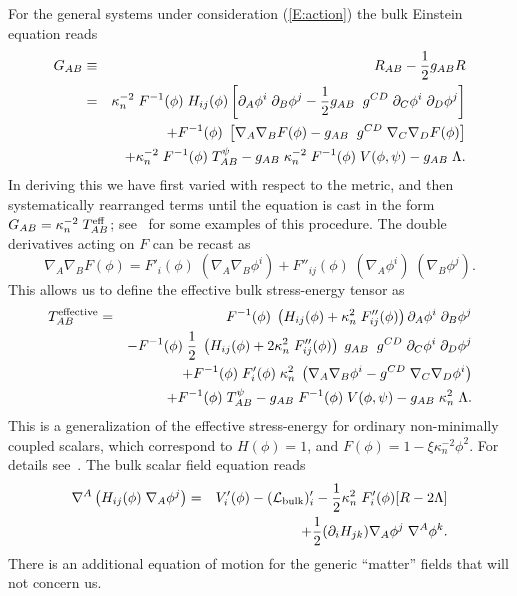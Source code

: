 \documentclass[a4paper,10pt]{article}
\begin{document}
For the general systems under consideration (\ref{E:action}) the
bulk Einstein equation reads
%
\begin{eqnarray}
G_{AB}&\equiv& R_{AB}-{1 \over 2}g_{AB}R
\nonumber\\
&=& 
\kappa_n^{-2} \; F^{-1}(\phi) \; H_{ij}(\phi)
\left[
\partial_{A}\phi^i \; \partial_{B}\phi^j 
-{1 \over 2} g_{AB} \;\;
g^{CD} \;\partial_{C}\phi^i \; \partial_{D}\phi^j
\right] 
\nonumber \\
&&
+F^{-1}(\phi) \; 
\left[
\nabla_A \nabla_B F(\phi)
-g_{AB}  \; \; g^{CD} \;\nabla_C \nabla_D F(\phi)
\right]
\nonumber \\
&&
+\kappa_n^{-2}\;F^{-1}(\phi) \; T_{AB}^\psi
- g_{AB} \;\kappa_n^{-2}\;F^{-1}(\phi)\; V(\phi,\psi)
- g_{AB} \;\Lambda.
\label{E:bulk-einstein-tensor}
\end{eqnarray}
%
In deriving this we have first varied with respect to the metric, and
then systematically rearranged terms until the equation is cast in the
form $G_{AB} = \kappa_n^{-2}\;T^{\mathrm{eff}}_{AB}$; see~\cite{scalars} for
some examples of this procedure.  The double derivatives acting on $F$
can be recast as
%
\begin{equation}
\nabla_A \nabla_B F(\phi) = 
F'_i(\phi) \; (\nabla_A \nabla_B \phi^i)  
+
F''_{ij}(\phi) \; (\nabla_A \phi^i) \; (\nabla_B \phi^j).
\end{equation}
%
This allows us to define the effective bulk stress-energy tensor as
%
\begin{eqnarray}
T_{AB}^{\mathrm{effective}} &=& 
F^{-1}(\phi) \; 
\left(H_{ij}(\phi) + \kappa_n^2 \; F''_{ij}(\phi) \right)
\partial_{A}\phi^i \; \partial_{B}\phi^j 
\nonumber \\
&& - 
F^{-1}(\phi)  \;  {1 \over 2} \;
\left(H_{ij}(\phi) + 2 \kappa_n^2 \; F''_{ij}(\phi) \right)
\; g_{AB} \;\;
g^{CD} \;\partial_{C}\phi^i \; \partial_{D}\phi^j 
\nonumber \\
&&
+F^{-1}(\phi) \;  F'_i(\phi) \; \kappa_n^2 \;
\left(
\nabla_A \nabla_B \phi^i - g^{CD} \;\nabla_C \nabla_D\phi^i
\right)
\nonumber \\
&&
+F^{-1}(\phi) \; T_{AB}^\psi
- g_{AB} \;F^{-1}(\phi)\; V(\phi,\psi)
- g_{AB}\; \kappa_n^2 \; \Lambda.
\label{E:bulk-einstein-tensor-2}
\end{eqnarray}
%
This is a generalization of the effective stress-energy for ordinary
non-minimally coupled scalars, which correspond to $H(\phi)=1$, and
$F(\phi)=1-\xi\kappa_n^{-2}\phi^2$. For details see~\cite{scalars}.
The bulk scalar field equation reads
%
\begin{eqnarray}
\nabla^A\left(H_{ij}(\phi)\;\nabla_A\phi^j\right)
&=&
V'_i(\phi) - ({\mathcal L}_{\mathrm{bulk}})'_i - {1\over2} \kappa_n^2\;F'_i(\phi) [R-2\Lambda] 
\nonumber\\
&&
+ {1\over2} (\partial_i H_{jk}) \nabla_A\phi^j \; \nabla^A\phi^k.
\end{eqnarray}
%
There is an additional equation of motion for the generic ``matter''
fields that will not concern us.
\end{document}
